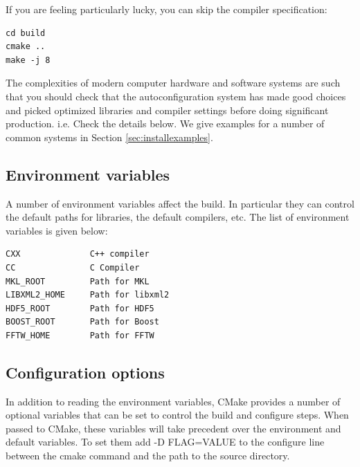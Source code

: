 If you are feeling particularly lucky, you can skip the compiler specification:
\verbatimfont{\footnotesize}
\begin{verbatim}
cd build
cmake ..
make -j 8
\end{verbatim}

The complexities of modern computer hardware and software systems are
such that you should check that the autoconfiguration system has made
good choices and picked optimized libraries and compiler settings
before doing significant production. i.e. Check the details below. We
give examples for a number of common systems in Section \ref{sec:installexamples}.

\subsection{Environment variables}
\label{sec:envvar}
A number of environment variables affect the build.  In particular
they can control the default paths for libraries, the default
compilers, etc.  The list of environment variables is given below:
\verbatimfont{\footnotesize}%
\begin{verbatim}
CXX              C++ compiler
CC               C Compiler
MKL_ROOT         Path for MKL
LIBXML2_HOME     Path for libxml2
HDF5_ROOT        Path for HDF5
BOOST_ROOT       Path for Boost
FFTW_HOME        Path for FFTW
\end{verbatim}

\subsection{Configuration options}
\label{sec:cmakeoptions}
In addition to reading the environment variables, CMake provides a
number of optional variables that can be set to control the build and
configure steps.  When passed to CMake, these variables will take
precedent over the environment and default variables.  To set them
add -D FLAG=VALUE to the configure line between the cmake command and
the path to the source directory.

